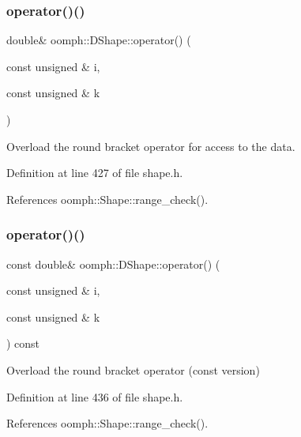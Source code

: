 \subsubsection{\texorpdfstring{operator()()}{operator()()}\hspace{0.1cm}{\footnotesize\ttfamily [1/4]}}
{\footnotesize\ttfamily double\& oomph\+::\+D\+Shape\+::operator() (\begin{DoxyParamCaption}\item[{const unsigned \&}]{i,  }\item[{const unsigned \&}]{k }\end{DoxyParamCaption})\hspace{0.3cm}{\ttfamily [inline]}}



Overload the round bracket operator for access to the data. 



Definition at line 427 of file shape.\+h.



References oomph\+::\+Shape\+::range\+\_\+check().

\mbox{\label{classoomph_1_1DShape_a661796d8dd59c34c2d9a45c580ba213c}} 
\subsubsection{\texorpdfstring{operator()()}{operator()()}\hspace{0.1cm}{\footnotesize\ttfamily [2/4]}}
{\footnotesize\ttfamily const double\& oomph\+::\+D\+Shape\+::operator() (\begin{DoxyParamCaption}\item[{const unsigned \&}]{i,  }\item[{const unsigned \&}]{k }\end{DoxyParamCaption}) const\hspace{0.3cm}{\ttfamily [inline]}}



Overload the round bracket operator (const version) 



Definition at line 436 of file shape.\+h.



References oomph\+::\+Shape\+::range\+\_\+check().

